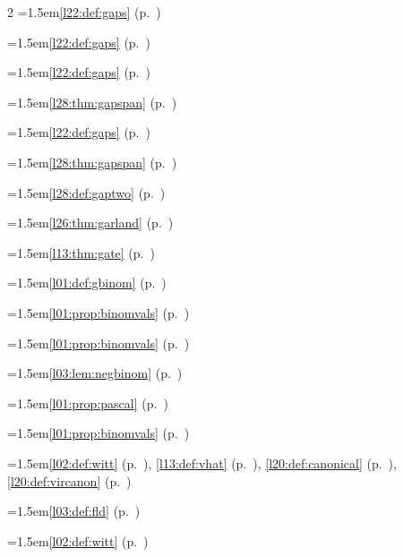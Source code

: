 \begin{multicols}{2}
\hangindent=1.5em\quad \ref{l22:def:gaps} (p.~\pageref{l22:def:gaps})\par
\hangindent=1.5em\quad \ref{l22:def:gaps} (p.~\pageref{l22:def:gaps})\par
\hangindent=1.5em\quad \ref{l22:def:gaps} (p.~\pageref{l22:def:gaps})\par
\hangindent=1.5em\quad \ref{l28:thm:gapspan} (p.~\pageref{l28:thm:gapspan})\par
\hangindent=1.5em\quad \ref{l22:def:gaps} (p.~\pageref{l22:def:gaps})\par
\hangindent=1.5em\quad \ref{l28:thm:gapspan} (p.~\pageref{l28:thm:gapspan})\par
\hangindent=1.5em\quad \ref{l28:def:gaptwo} (p.~\pageref{l28:def:gaptwo})\par
\hangindent=1.5em\quad \ref{l26:thm:garland} (p.~\pageref{l26:thm:garland})\par
\hangindent=1.5em\quad \ref{l13:thm:gate} (p.~\pageref{l13:thm:gate})\par
\hangindent=1.5em\quad \ref{l01:def:gbinom} (p.~\pageref{l01:def:gbinom})\par
\hangindent=1.5em\quad \ref{l01:prop:binomvals} (p.~\pageref{l01:prop:binomvals})\par
\hangindent=1.5em\quad \ref{l01:prop:binomvals} (p.~\pageref{l01:prop:binomvals})\par
\hangindent=1.5em\quad \ref{l03:lem:negbinom} (p.~\pageref{l03:lem:negbinom})\par
\hangindent=1.5em\quad \ref{l01:prop:pascal} (p.~\pageref{l01:prop:pascal})\par
\hangindent=1.5em\quad \ref{l01:prop:binomvals} (p.~\pageref{l01:prop:binomvals})\par
\hangindent=1.5em\quad \ref{l02:def:witt} (p.~\pageref{l02:def:witt}), \ref{l13:def:vhat} (p.~\pageref{l13:def:vhat}), \ref{l20:def:canonical} (p.~\pageref{l20:def:canonical}), \ref{l20:def:vircanon} (p.~\pageref{l20:def:vircanon})\par
\hangindent=1.5em\quad \ref{l03:def:fld} (p.~\pageref{l03:def:fld})\par
\hangindent=1.5em\quad \ref{l02:def:witt} (p.~\pageref{l02:def:witt})\par

\end{multicols}
